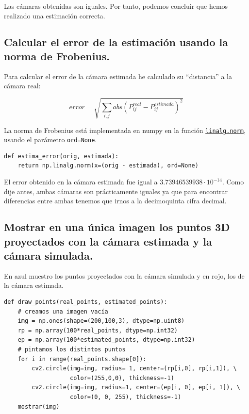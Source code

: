 \documentclass[11pt,a4paper]{article}
\theoremstyle{plain}
\theoremstyle{definition}
\begin{document}
Las cámaras obtenidas son iguales. Por tanto, podemos concluir que hemos realizado una estimación correcta.

\subsection{Calcular el error de la estimación usando la norma de Frobenius.}

Para calcular el error de la cámara estimada he calculado su ``distancia'' a la cámara real:

\begin{displaymath}
error = \sqrt{\sum_{i,j} abs(P^{real}_{ij} - P^{estimada}_{ij})^2}
\end{displaymath}

La norma de Frobenius está implementada en numpy en la función \href{https://docs.scipy.org/doc/numpy/reference/generated/numpy.linalg.norm.html}{\texttt{linalg.norm}}, usando el parámetro \texttt{ord=None}.

\begin{verbatim}
def estima_error(orig, estimada):
    return np.linalg.norm(x=(orig - estimada), ord=None)
\end{verbatim}

El error obtenido en la cámara estimada fue igual a $3.73946539938 \cdot 10^{-14}$. Como dije antes, ambas cámaras son prácticamente iguales ya que para encontrar diferencias entre ambas tenemos que irnos a la decimoquinta cifra decimal.

\subsection{Mostrar en una única imagen los puntos 3D proyectados con la cámara estimada y la cámara simulada.}

En azul muestro los puntos proyectados con la cámara simulada y en rojo, los de la cámara estimada.

\begin{verbatim}
def draw_points(real_points, estimated_points):
    # creamos una imagen vacía
    img = np.ones(shape=(200,100,3), dtype=np.uint8)
    rp = np.array(100*real_points, dtype=np.int32)
    ep = np.array(100*estimated_points, dtype=np.int32)
    # pintamos los distintos puntos
    for i in range(real_points.shape[0]):
        cv2.circle(img=img, radius= 1, center=(rp[i,0], rp[i,1]), \
                   color=(255,0,0), thickness=-1)
        cv2.circle(img=img, radius=1, center=(ep[i, 0], ep[i, 1]), \
                   color=(0, 0, 255), thickness=-1)
    mostrar(img)
\end{verbatim}
\end{document}
